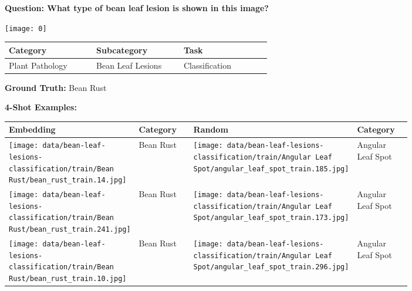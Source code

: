
    \begin{figure}[t!]
        \small
        \textbf{Question: What type of bean leaf lesion is shown in this image?}
        \vspace{1em}
        \begin{center}
        \texttt{[image: 0]}
        \end{center}
        \vspace{1em}
        
        \begin{tabular}{|p{0.28\linewidth}|p{0.28\linewidth}|p{0.28\linewidth}|}
            \hline
            \textbf{Category} & \textbf{Subcategory} & \textbf{Task} \\
            \hline
            Plant Pathology & Bean Leaf Lesions & Classification \\
            \hline
        \end{tabular}
        \vspace{1em}

        \textbf{Ground Truth:} Bean Rust
        \vspace{1em}

        \textbf{4-Shot Examples:}
        \vspace{1em}
        
        \begin{tabular}{|p{0.22\linewidth}|p{0.22\linewidth}|p{0.22\linewidth}|p{0.22\linewidth}|}
            \hline
            \textbf{Embedding} & \textbf{Category} & \textbf{Random} & \textbf{Category} \\
            \hline
    
            \texttt{[image: data/bean-leaf-lesions-classification/train/Bean Rust/bean\_rust\_train.14.jpg]} & Bean Rust & 
            \texttt{[image: data/bean-leaf-lesions-classification/train/Angular Leaf Spot/angular\_leaf\_spot\_train.185.jpg]} & Angular Leaf Spot \\
            \hline
        
            \texttt{[image: data/bean-leaf-lesions-classification/train/Bean Rust/bean\_rust\_train.241.jpg]} & Bean Rust & 
            \texttt{[image: data/bean-leaf-lesions-classification/train/Angular Leaf Spot/angular\_leaf\_spot\_train.173.jpg]} & Angular Leaf Spot \\
            \hline
        
            \texttt{[image: data/bean-leaf-lesions-classification/train/Bean Rust/bean\_rust\_train.10.jpg]} & Bean Rust & 
            \texttt{[image: data/bean-leaf-lesions-classification/train/Angular Leaf Spot/angular\_leaf\_spot\_train.296.jpg]} & Angular Leaf Spot \\
            \hline
        

\end{tabular}
\end{figure}
